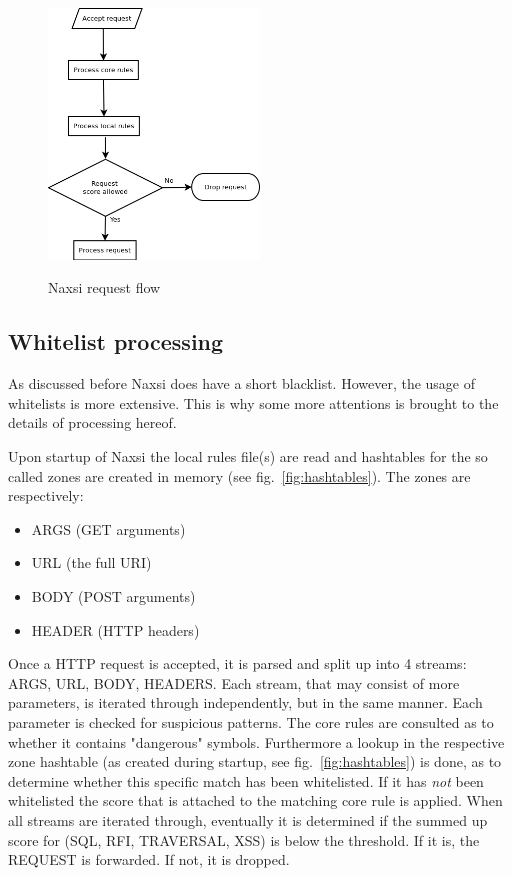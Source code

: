 \documentclass[Naxsi]{subfiles}
\begin{document}
\begin{figure}[h]
\caption{Naxsi request flow}
\centering
\includegraphics[width=0.5\textwidth] {images/naxsi_flow.png}
\label{fig:naxsi_flow}
\end{figure}

\subsection{Whitelist processing}
\label{sec:naxsi_whitelist}
As discussed before Naxsi does have a short blacklist. However, the usage of whitelists is more extensive. This is why some more attentions is brought to the details of processing hereof.

Upon startup of Naxsi the local rules file(s) are read and hashtables for the so called zones are created in memory (see fig.~\ref{fig:hashtables}). The zones are respectively:
\begin{itemize}
	\item ARGS (GET arguments)
	\item URL (the full URI)
	\item BODY (POST arguments)
	\item HEADER (HTTP headers)
\end{itemize}

Once a HTTP request is accepted, it is parsed and split up into 4 streams: ARGS, URL, BODY, HEADERS. Each stream, that may consist of more parameters, is iterated through independently, but in the same manner. Each parameter is checked for suspicious patterns. The core rules are consulted as to whether it contains "dangerous" symbols. Furthermore a lookup in the respective zone hashtable (as created during startup, see fig.~\ref{fig:hashtables}) is done, as to determine whether this specific match has been whitelisted. If it has \emph{not} been whitelisted the score that is attached to the matching core rule is applied. When all streams are iterated through, eventually it is determined if the summed up score for  (SQL, RFI, TRAVERSAL, XSS) is below the threshold. If it is, the REQUEST is forwarded. If not, it is dropped. 
\end{document}
